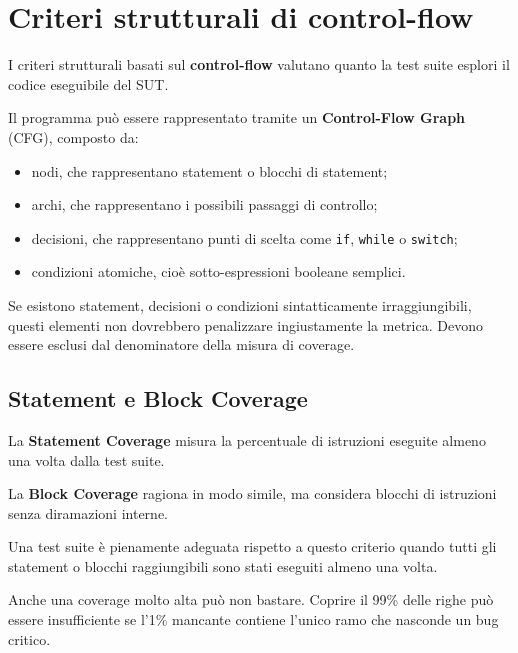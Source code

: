 \section{Criteri strutturali di control-flow}

I criteri strutturali basati sul \textbf{control-flow} valutano quanto la test suite esplori il codice eseguibile del SUT.

Il programma può essere rappresentato tramite un \textbf{Control-Flow Graph} (CFG), composto da:

\begin{itemize}
    \item nodi, che rappresentano statement o blocchi di statement;
    \item archi, che rappresentano i possibili passaggi di controllo;
    \item decisioni, che rappresentano punti di scelta come \texttt{if}, \texttt{while} o \texttt{switch};
    \item condizioni atomiche, cioè sotto-espressioni booleane semplici.
\end{itemize}

\begin{notaesame}
Se esistono statement, decisioni o condizioni sintatticamente irraggiungibili, questi elementi non dovrebbero penalizzare ingiustamente la metrica. Devono essere esclusi dal denominatore della misura di coverage.
\end{notaesame}

\subsection{Statement e Block Coverage}

La \textbf{Statement Coverage} misura la percentuale di istruzioni eseguite almeno una volta dalla test suite.

La \textbf{Block Coverage} ragiona in modo simile, ma considera blocchi di istruzioni senza diramazioni interne.

Una test suite è pienamente adeguata rispetto a questo criterio quando tutti gli statement o blocchi raggiungibili sono stati eseguiti almeno una volta.

\begin{notaprof}
Anche una coverage molto alta può non bastare. Coprire il 99\% delle righe può essere insufficiente se l'1\% mancante contiene l'unico ramo che nasconde un bug critico.
\end{notaprof}

